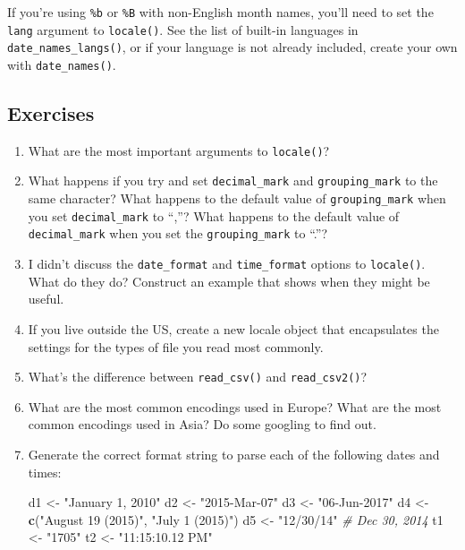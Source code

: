 \documentclass[]{book}
\newenvironment{Shaded}{\begin{snugshade}}{\end{snugshade}}
\newcommand{\KeywordTok}[1]{\textcolor[rgb]{0.13,0.29,0.53}{\textbf{{#1}}}}
\newcommand{\DataTypeTok}[1]{\textcolor[rgb]{0.13,0.29,0.53}{{#1}}}
\newcommand{\StringTok}[1]{\textcolor[rgb]{0.31,0.60,0.02}{{#1}}}
\newcommand{\CommentTok}[1]{\textcolor[rgb]{0.56,0.35,0.01}{\textit{{#1}}}}
\newcommand{\NormalTok}[1]{{#1}}
\begin{document}
If you're using \texttt{\%b} or \texttt{\%B} with non-English month
names, you'll need to set the \texttt{lang} argument to
\texttt{locale()}. See the list of built-in languages in
\texttt{date\_names\_langs()}, or if your language is not already
included, create your own with \texttt{date\_names()}.

\begin{Shaded}
\end{Shaded}

\subsection{Exercises}\label{exercises-20}

\begin{enumerate}
\def\labelenumi{\arabic{enumi}.}
\item
  What are the most important arguments to \texttt{locale()}?
\item
  What happens if you try and set \texttt{decimal\_mark} and
  \texttt{grouping\_mark} to the same character? What happens to the
  default value of \texttt{grouping\_mark} when you set
  \texttt{decimal\_mark} to ``,''? What happens to the default value of
  \texttt{decimal\_mark} when you set the \texttt{grouping\_mark} to
  ``.''?
\item
  I didn't discuss the \texttt{date\_format} and \texttt{time\_format}
  options to \texttt{locale()}. What do they do? Construct an example
  that shows when they might be useful.
\item
  If you live outside the US, create a new locale object that
  encapsulates the settings for the types of file you read most
  commonly.
\item
  What's the difference between \texttt{read\_csv()} and
  \texttt{read\_csv2()}?
\item
  What are the most common encodings used in Europe? What are the most
  common encodings used in Asia? Do some googling to find out.
\item
  Generate the correct format string to parse each of the following
  dates and times:

\begin{Shaded}
\begin{Highlighting}[]
\NormalTok{d1 <-}\StringTok{ "January 1, 2010"}
\NormalTok{d2 <-}\StringTok{ "2015-Mar-07"}
\NormalTok{d3 <-}\StringTok{ "06-Jun-2017"}
\NormalTok{d4 <-}\StringTok{ }\KeywordTok{c}\NormalTok{(}\StringTok{"August 19 (2015)"}\NormalTok{, }\StringTok{"July 1 (2015)"}\NormalTok{)}
\NormalTok{d5 <-}\StringTok{ "12/30/14"} \CommentTok{# Dec 30, 2014}
\NormalTok{t1 <-}\StringTok{ "1705"}
\NormalTok{t2 <-}\StringTok{ "11:15:10.12 PM"}
\end{Highlighting}
\end{Shaded}
\end{enumerate}
\end{document}
